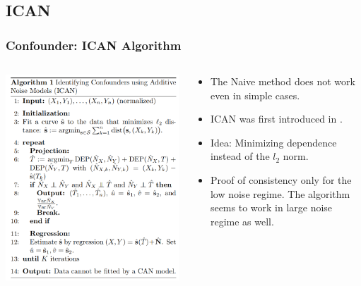 \documentclass{beamer}
\begin{document}
\subsection{ICAN}
\begin{frame}
\frametitle{Confounder: ICAN Algorithm}
\begin{columns}
\begin{column}{0.5\textwidth}
	\includegraphics[scale=0.25]{ican.png}
\end{column}
\begin{column}{0.5\textwidth}
	\begin{itemize}
		\item The Naive method does not work even in simple cases.
		\item ICAN was first introduced in \cite{confounder}.
		\item Idea: Minimizing dependence instead of the $l_2$ norm.
		\item Proof of consistency only for the low noise regime. The algorithm seems to work in large noise regime as well.
	\end{itemize}
\end{column}
\end{columns}
\end{frame}
\end{document}

